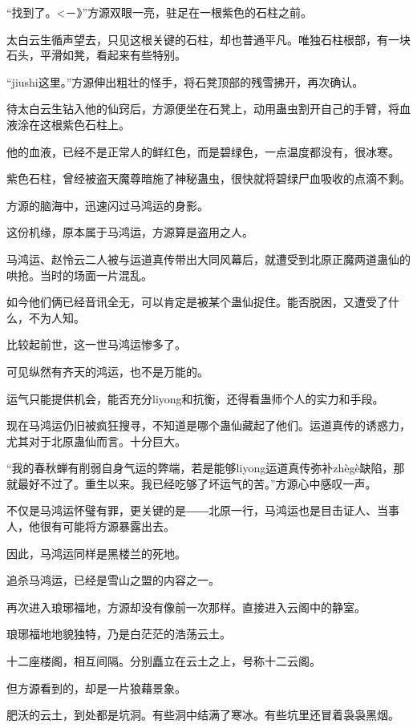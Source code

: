 
\begin{this_body}

“找到了。<－》”方源双眼一亮，驻足在一根紫色的石柱之前。

太白云生循声望去，只见这根关键的石柱，却也普通平凡。唯独石柱根部，有一块石头，平滑如凳，看起来有些特别。

“jiushi这里。”方源伸出粗壮的怪手，将石凳顶部的残雪拂开，再次确认。

待太白云生钻入他的仙窍后，方源便坐在石凳上，动用蛊虫割开自己的手臂，将血液涂在这根紫色石柱上。

他的血液，已经不是正常人的鲜红色，而是碧绿色，一点温度都没有，很冰寒。

紫色石柱，曾经被盗天魔尊暗施了神秘蛊虫，很快就将碧绿尸血吸收的点滴不剩。

方源的脑海中，迅速闪过马鸿运的身影。

这份机缘，原本属于马鸿运，方源算是盗用之人。

马鸿运、赵怜云二人被与运道真传带出大同风幕后，就遭受到北原正魔两道蛊仙的哄抢。当时的场面一片混乱。

如今他们俩已经音讯全无，可以肯定是被某个蛊仙捉住。能否脱困，又遭受了什么，不为人知。

比较起前世，这一世马鸿运惨多了。

可见纵然有齐天的鸿运，也不是万能的。

运气只能提供机会，能否充分liyong和抗衡，还得看蛊师个人的实力和手段。

现在马鸿运仍旧被疯狂搜寻，不知道是哪个蛊仙藏起了他们。运道真传的诱惑力，尤其对于北原蛊仙而言。十分巨大。

“我的春秋蝉有削弱自身气运的弊端，若是能够liyong运道真传弥补zhègè缺陷，那就最好不过了。重生以来。我已经吃够了坏运气的苦。”方源心中感叹一声。

不仅是马鸿运怀璧有罪，更关键的是――北原一行，马鸿运也是目击证人、当事人，他很有可能将方源暴露出去。

因此，马鸿运同样是黑楼兰的死地。

追杀马鸿运，已经是雪山之盟的内容之一。

再次进入琅琊福地，方源却没有像前一次那样。直接进入云阁中的静室。

琅琊福地地貌独特，乃是白茫茫的浩荡云土。

十二座楼阁，相互间隔。分别矗立在云土之上，号称十二云阁。

但方源看到的，却是一片狼藉景象。

肥沃的云土，到处都是坑洞。有些洞中结满了寒冰。有些坑里还冒着袅袅黑烟。


\end{this_body}
